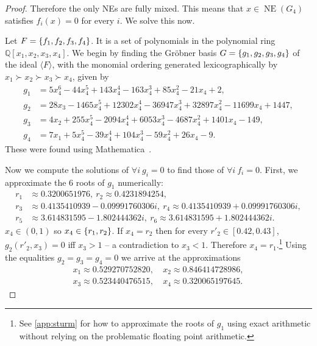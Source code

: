 \documentclass[preprint,12pt,authoryear]{elsarticle}
\newcommand{\Q}{\mathbb{Q}}
\DeclarePairedDelimiter{\ios}{\{}{\}}
\newcommand{\s}{\ios*}
\DeclareMathOperator{\NE}{NE}
\begin{document}
\begin{proof}
  \bigskip

  Therefore the only NEs are fully mixed. This means that $x\in\NE(G_4)$ satisfies 
  $f_i(x)=0$ for every $i$. We solve this now.

  Let $F=\s{f_1,f_2,f_3,f_4}$. It is a set of polynomials in the polynomial ring 
  $\Q[x_1,x_2,x_3,x_4]$. We begin by finding the Gr\"obner basis $G=\s{g_1,g_2,g_3,g_4}$ of 
  the ideal $\langle F\rangle$, with the monomial ordering generated lexicographically by 
  $x_1\succ x_2\succ x_3\succ x_4$, given by
  \begin{align*}
    g_1&=5x_4^6-44x_4^5+143x_4^4-163x_4^3+85x_4^2-21x_4+2,\\
    g_2&=28x_3-1465x_4^5+12302x_4^4-36947x_4^3+32897x_4^2-11699x_4+1447,\\
    g_3&=4x_2+255x_4^5-2094x_4^4+6053x_4^3-4687x_4^2+1401x_4-149,\\
    g_4&=7x_1+5x_4^5-39x_4^4+104x_4^3-59x_4^2+26x_4-9.
  \end{align*}
  These were found using Mathematica~\citep{Mathematica}.

  Now we compute the solutions of $\forall i~g_i=0$ to find those of $\forall i~f_i=0$.  
  First, we approximate the 6 roots of $g_1$ numerically:
  \begin{align*}
    r_1&\approx0.3200651976,~r_2\approx0.4231894254,\\
    r_3&\approx0.4135410939-0.09991760306i,~r_4\approx0.4135410939+0.09991760306i,\\
    r_5&\approx3.614831595-1.802444362i,~r_6\approx3.614831595+1.802444362i.
  \end{align*}
  $x_4\in(0,1)$ so $x_4\in\s{r_1,r_2}$. If $x_4=r_2$ then for every $r'_2\in[0.42,0.43]$, $g_2(r'_2,x_3)=0$ iff $x_3>1$ -- a contradiction to $x_3<1$.
  Therefore $x_4=r_1$.\footnote{See \ref{app:sturm} for how to approximate the roots of $g_1$ using exact arithmetic without relying on the problematic floating point arithmetic.} Using the equalities $g_2=g_3=g_4=0$ we arrive at the approximations
  \begin{align*}
    x_1\approx0.529270752820,&~x_2\approx0.846414728986,\\
    x_3\approx0.523440476515,&~x_4\approx0.320065197645.
  \end{align*}
  

\end{proof}
\end{document}
